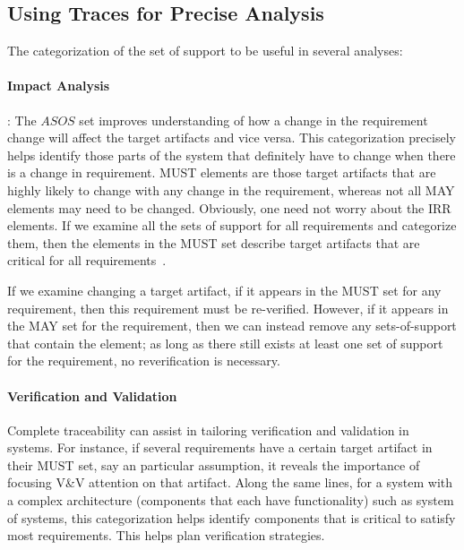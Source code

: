 \subsection{Using Traces for Precise Analysis}

The categorization of the set of support to be useful in several analyses: 

\paragraph{Impact Analysis}: The $ASOS$ set improves understanding of how a change in the requirement change will affect the target artifacts and vice versa. This categorization precisely helps identify those parts of the system that definitely have to change when there is a change in requirement. MUST elements are those target artifacts that are highly likely to change with any change in the requirement, whereas not all MAY elements may need to be changed. Obviously, one need not worry about the IRR elements. If we examine all the sets of support for all requirements and categorize them, then the elements in the MUST set describe target artifacts that are critical for all requirements~.  %


If we examine changing a target artifact, if it appears in the MUST set for any requirement, then this requirement must be re-verified.  However, if it appears in the MAY set for the requirement, then we can instead remove any sets-of-support that contain the element; as long as there still exists at least one set of support for the requirement, no reverification is necessary.


\paragraph{Verification and Validation}

Complete traceability can assist in tailoring verification and validation in systems. For instance, if several requirements have a certain target artifact in their MUST set, say an particular assumption, it reveals the importance of focusing V\&V attention on that artifact. Along the same lines, for a system with a complex architecture (components that each have functionality) such as  system of systems, this categorization helps identify components that is critical to satisfy most requirements. This helps plan verification strategies.

